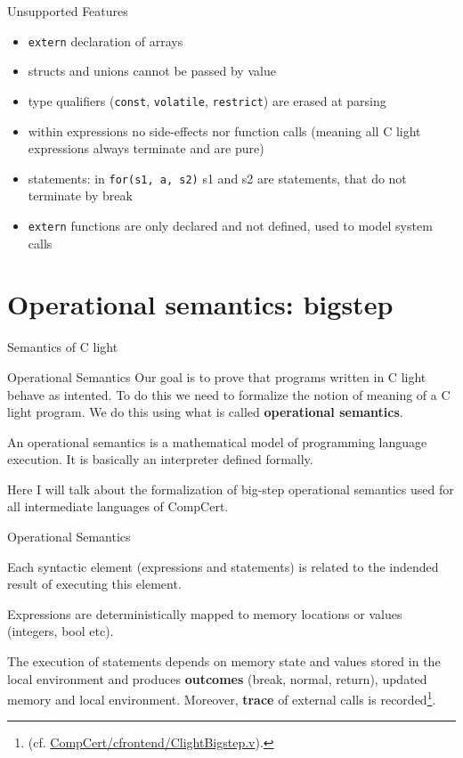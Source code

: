 \documentclass{beamer}
\begin{document}
\begin{frame}{Unsupported Features}
  \begin{itemize}
  \item \texttt{extern} declaration of arrays
\item structs and unions cannot be passed by value
\item  type qualifiers (\texttt{const}, \texttt{volatile}, \texttt{restrict}) are erased at parsing
\item within expressions no side-effects nor function calls (meaning all C light expressions always terminate and are pure)
\item statements: in \texttt{for(s1, a, s2)} s1 and s2 are statements, that do not terminate by break
\item \texttt{extern} functions are only declared and not defined, used to model system calls
\end{itemize}
  
  \end{frame}


  \section{Operational semantics: bigstep}
  \begin{frame}
  \begin{center}
    \huge Semantics of C light
    \end{center}
  \end{frame}

  \begin{frame}{Operational Semantics}
    Our goal is to prove that programs written in C light behave as intented. To do this we need to formalize the notion of meaning of a C light program. We do this using what is called {\bf operational semantics}.

    \bigskip
    
    An operational semantics is a mathematical model of programming language execution. It is basically an interpreter defined formally.
    \bigskip
    
    Here I will talk about the formalization of big-step operational semantics used for all intermediate languages of CompCert.
  \end{frame}
  \begin{frame}{Operational Semantics}
 
    Each syntactic element (expressions and statements) is related to the indended result of executing this element.

    \bigskip
    
    Expressions are deterministically mapped to memory locations or values (integers, bool etc).

    \bigskip 
    The execution of statements depends on memory state and values stored in the local environment and produces {\bf outcomes} (break, normal, return), updated memory and local environment. Moreover, {\bf trace} of external calls is recorded\footnote{       (cf. \url{CompCert/cfrontend/ClightBigstep.v}).}.
     
    \end{frame}
\end{document}
